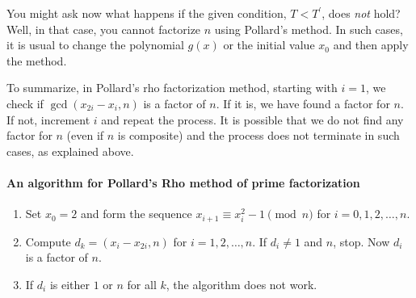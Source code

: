 \documentclass{subfiles}
\begin{document}
	You might ask now what happens if the given condition, $T<T^{\prime}$, does \textit{not} hold? Well, in that case, you cannot factorize $n$ using Pollard's method. In such cases, it is usual to change the polynomial $g(x)$ or the initial value $x_0$ and then apply the method.


	To summarize, in Pollard's rho factorization method, starting with $i=1$, we check if $\gcd(x_{2i} - x_{i}, n)$ is a factor of $n$. If it is, we have found a factor for $n$. If not, increment $i$ and repeat the process. It is possible that we do not find any factor for $n$ (even if $n$ is composite) and the process does not terminate in such cases, as explained above.
\paragraph{An algorithm for Pollard's Rho method of prime factorization}
	\begin{enumerate}[1.]
		\item Set $x_0=2$ and form the sequence $x_{i+1} \equiv x_i^2 -1 \pmod n$ for $i=0,1,2,\ldots, n$.
		\item Compute $d_k=(x_i-x_{2i}, n)$ for $i=1,2,\ldots, n$. If $d_i \neq 1$ and $n$, stop. Now $d_i$ is a factor of $n$.
		\item If $d_i$ is either $1$ or $n$ for all $k$, the algorithm does not work.
	\end{enumerate}
\end{document}
